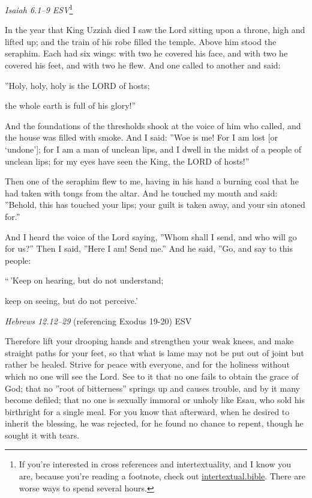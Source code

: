 \documentclass[
]{article}
\newcommand{\RL}[1]{\beginR #1\endR}
\begin{document}
\emph{Isaiah 6.1--9 ESV}\footnote{If you're interested in cross
  references and intertextuality, and I know you are, because you're
  reading a footnote, check out
  \href{http://intertextual.bible}{\ul{intertextual.bible}}. There are
  worse ways to spend several hours.}

In the year that King Uzziah died I saw the Lord sitting upon a throne,
high and lifted up; and the train of his robe filled the temple. Above
him stood the seraphim. Each had six wings: with two he covered his
face, and with two he covered his feet, and with two he flew. And one
called to another and said:

\RL{''}Holy, holy, holy is the LORD of hosts;

the whole earth is full of his glory!''

And the foundations of the thresholds shook at the voice of him who
called, and the house was filled with smoke. And I said: \RL{''}Woe is
me! For I am lost {[}or `undone'{]}; for I am a man of unclean lips, and
I dwell in the midst of a people of unclean lips; for my eyes have seen
the King, the LORD of hosts!''

Then one of the seraphim flew to me, having in his hand a burning coal
that he had taken with tongs from the altar. And he touched my mouth and
said: \RL{''}Behold, this has touched your lips; your guilt is taken
away, and your sin atoned for.''

And I heard the voice of the Lord saying, \RL{''}Whom shall I send, and
who will go for us?'' Then I said, \RL{''}Here I am! Send me.'' And he
said, \RL{''}Go, and say to this people:

\RL{``\,'}Keep on hearing, but do not understand;

keep on seeing, but do not perceive.\RL{'}

\emph{Hebrews 12.12--29} (referencing Exodus 19-20) ESV

Therefore lift your drooping hands and strengthen your weak knees, and
make straight paths for your feet, so that what is lame may not be put
out of joint but rather be healed. Strive for peace with everyone, and
for the holiness without which no one will see the Lord. See to it that
no one fails to obtain the grace of God; that no \RL{''}root of
bitterness'' springs up and causes trouble, and by it many become
defiled; that no one is sexually immoral or unholy like Esau, who sold
his birthright for a single meal. For you know that afterward, when he
desired to inherit the blessing, he was rejected, for he found no chance
to repent, though he sought it with tears.
\end{document}
